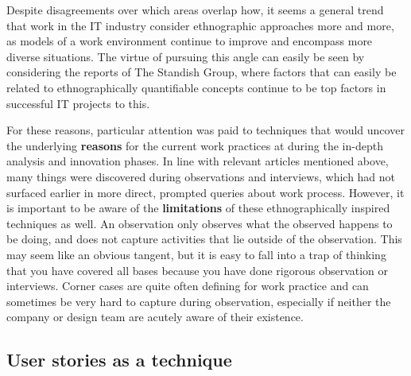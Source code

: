 Despite disagreements over which areas overlap how, it seems a general trend that work in the IT industry consider
ethnographic approaches more and more, as models of a work environment continue to improve and encompass more diverse
situations. The virtue of pursuing this angle can easily be seen by considering the reports of The Standish Group, where
factors that can easily be related to ethnographically quantifiable concepts continue to be top factors in successful IT
projects to this\cite{standish2012}.

For these reasons, particular attention was paid to techniques that would uncover the underlying \textbf{reasons} for
the current work practices at \gomonkey{} during the in-depth analysis and innovation phases. In line with relevant
articles mentioned above, many things were discovered during observations and interviews, which had not surfaced earlier
in more direct, prompted queries about work process. However, it is important to be aware of the \textbf{limitations} of
these ethnographically inspired techniques as well. An observation only observes what the observed happens to be doing, and
does not capture activities that lie outside of the observation. This may seem like an obvious tangent, but it is easy to fall
into a trap of thinking that you have covered all bases because you have done rigorous observation or interviews. Corner cases
are quite often defining for work practice and can sometimes be very hard to capture during observation, especially if neither
the company or design team are acutely aware of their existence.

\subsection{User stories as a technique}
